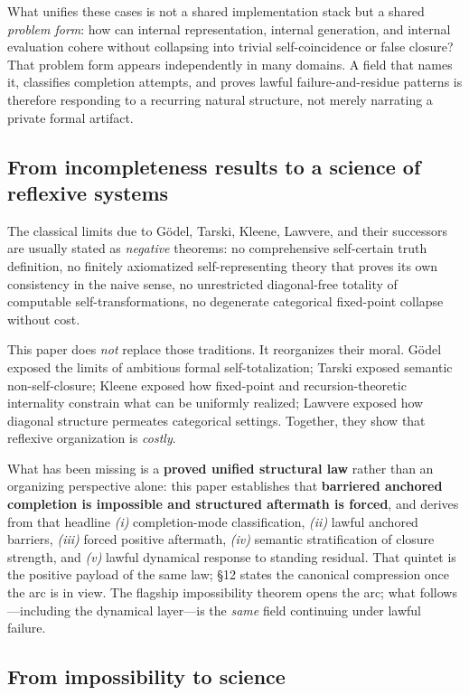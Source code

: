 \documentclass[11pt]{article}
\theoremstyle{plain}
\theoremstyle{definition}
\theoremstyle{remark}
\begin{document}
What unifies these cases is not a shared implementation stack but a shared \emph{problem form}: how can internal representation, internal generation, and internal evaluation cohere without collapsing into trivial self-coincidence or false closure? That problem form appears independently in many domains. A field that names it, classifies completion attempts, and proves lawful failure-and-residue patterns is therefore responding to a recurring natural structure, not merely narrating a private formal artifact.

\subsection{From incompleteness results to a science of reflexive systems}

The classical limits due to Gödel, Tarski, Kleene, Lawvere, and their successors are usually stated as \emph{negative} theorems: no comprehensive self-certain truth definition, no finitely axiomatized self-representing theory that proves its own consistency in the naive sense, no unrestricted diagonal-free totality of computable self-transformations, no degenerate categorical fixed-point collapse without cost.

This paper does \emph{not} replace those traditions. It reorganizes their moral. Gödel exposed the limits of ambitious formal self-totalization; Tarski exposed semantic non-self-closure; Kleene exposed how fixed-point and recursion-theoretic internality constrain what can be uniformly realized; Lawvere exposed how diagonal structure permeates categorical settings. Together, they show that reflexive organization is \emph{costly}.

What has been missing is a \textbf{proved unified structural law} rather than an organizing perspective alone: this paper establishes that \textbf{barriered anchored completion is impossible and structured aftermath is forced}, and derives from that headline \emph{(i)} completion-mode classification, \emph{(ii)} lawful anchored barriers, \emph{(iii)} forced positive aftermath, \emph{(iv)} semantic stratification of closure strength, and \emph{(v)} lawful dynamical response to standing residual. That quintet is the positive payload of the same law; \S12 states the canonical compression once the arc is in view. The flagship impossibility theorem opens the arc; what follows---including the dynamical layer---is the \emph{same} field continuing under lawful failure.

\subsection{From impossibility to science}
\end{document}
